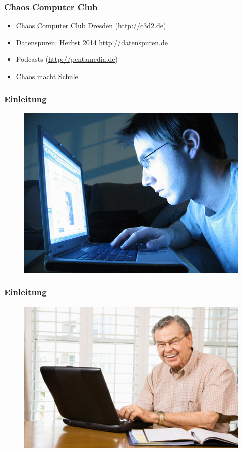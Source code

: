 \documentclass[12pt]{beamer}
\begin{document}
\begin{frame}
    \frametitle{Chaos Computer Club}
    \begin{itemize}
      \item<1-> Chaos Computer Club Dresden (\url{http://c3d2.de})
          \note{}
      \item<2-> Datenspuren: Herbst 2014 \url{http://datenspuren.de}
      \item<3-> Podcasts (\url{http://pentamedia.de})
      \item<4-> Chaos macht Schule
    \end{itemize}
\end{frame}

\begin{frame}
  \frametitle{Einleitung}
  \begin{figure}
    \includegraphics[height=0.7\textheight]{img/internet_user1.jpg}
  \end{figure}
\end{frame}

\begin{frame}
  \frametitle{Einleitung}
  \begin{figure}
    \includegraphics[height=0.7\textheight]{img/internet_user3.jpg}
  \end{figure}
\end{frame}
\end{document}

